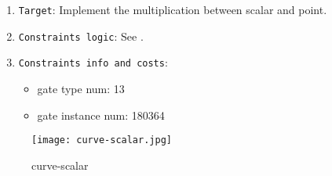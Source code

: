 
\begin{enumerate}
    \item \verb|Target|: Implement the multiplication between scalar and point.
    \item \verb|Constraints logic|: See .
    \item \verb|Constraints info and costs|:
    \begin{itemize}
        \item gate type num: 13 
        \item gate instance num: 180364          
    \end{itemize}
\end{enumerate}

\begin{figure}[!ht]
    \centering
    \texttt{[image: curve-scalar.jpg]}
    \caption{curve-scalar}
    \label{fig:curve-scalar}
\end{figure}
